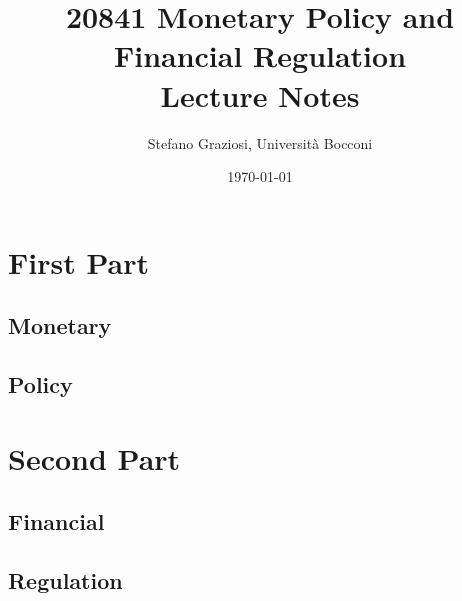 \documentclass[dvipsnames,12pt]{book}
\title{20841 Monetary Policy and Financial Regulation \\[1cm] \textbf{Lecture Notes}}
\author{Stefano Graziosi, Università Bocconi}
\date{\today}
\begin{document}
\maketitle

\tableofcontents

\part{First Part}

    \chapter{Monetary}

    \chapter{Policy}

\part{Second Part}

    \chapter{Financial}

    \chapter{Regulation}
\end{document}
